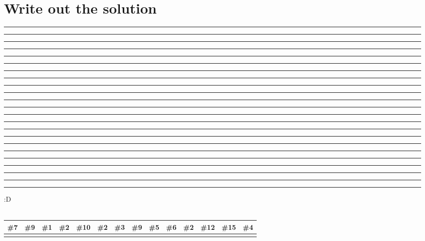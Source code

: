 \documentclass[12pt]{article}
\begin{document}
\section{Write out the solution}
\noindent 
\rule{0.4cm}{0.4pt} \rule{0.4cm}{0.4pt} \rule{0.4cm}{0.4pt} 
\quad 
\rule{0.4cm}{0.4pt} 
\quad 
\rule{0.4cm}{0.4pt} \rule{0.4cm}{0.4pt} \rule{0.4cm}{0.4pt} \rule{0.4cm}{0.4pt} 
\quad
\rule{0.4cm}{0.4pt} \rule{0.4cm}{0.4pt} \rule{0.4cm}{0.4pt}
\quad 
\rule{0.4cm}{0.4pt} \rule{0.4cm}{0.4pt} \rule{0.4cm}{0.4pt} \rule{0.4cm}{0.4pt} \rule{0.4cm}{0.4pt} 
\quad 
\rule{0.4cm}{0.4pt} \rule{0.4cm}{0.4pt} \rule{0.4cm}{0.4pt} \rule{0.4cm}{0.4pt} \rule{0.4cm}{0.4pt} \rule{0.4cm}{0.4pt} 
\quad 
\rule{0.4cm}{0.4pt} :D
\\\\
\noindent %
\begin{tabular}{|*{14}{W|}} 
\hline
\textbf{\#7} & \textbf{\#9} & \textbf{\#1} & \textbf{\#2} & 
\textbf{\#10} & \textbf{\#2} & \textbf{\#3} & \textbf{\#9} & 
\textbf{\#5} & \textbf{\#6} & \textbf{\#2} & 
\textbf{\#12} & \textbf{\#15} & \textbf{\#4} \\

\hline
& & & & & & & & & & & & & \\
\hline
\end{tabular}

\vspace{1em} %
\end{document}
